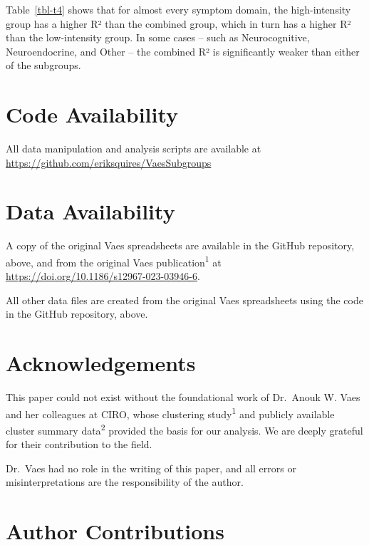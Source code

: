 \documentclass[
  letterpaper,
  DIV=11,
  numbers=noendperiod]{scrartcl}
\begin{document}
Table~\ref{tbl-t4} shows that for almost every symptom domain, the
high-intensity group has a higher R² than the combined group, which in
turn has a higher R² than the low-intensity group. In some cases -- such
as Neurocognitive, Neuroendocrine, and Other -- the combined R² is
significantly weaker than either of the subgroups.

\FloatBarrier
\bigskip

\section*{Code Availability}\label{sec-code}

All data manipulation and analysis scripts are available at
\url{https://github.com/eriksquires/VaesSubgroups}

\section*{Data Availability}\label{sec-data}

A copy of the original Vaes spreadsheets are available in the GitHub
repository, above, and from the original Vaes
publication\textsuperscript{1} at
\url{https://doi.org/10.1186/s12967-023-03946-6}.

All other data files are created from the original Vaes spreadsheets
using the code in the GitHub repository, above.

\newpage{}

\section*{Acknowledgements}\label{acknowledgements}

This paper could not exist without the foundational work of Dr.~Anouk W.
Vaes and her colleagues at CIRO, whose clustering
study\textsuperscript{1} and publicly available cluster summary
data\textsuperscript{2} provided the basis for our analysis. We are
deeply grateful for their contribution to the field.

Dr.~Vaes had no role in the writing of this paper, and all errors or
misinterpretations are the responsibility of the author.

\section*{Author Contributions}\label{author-contributions}
\end{document}
